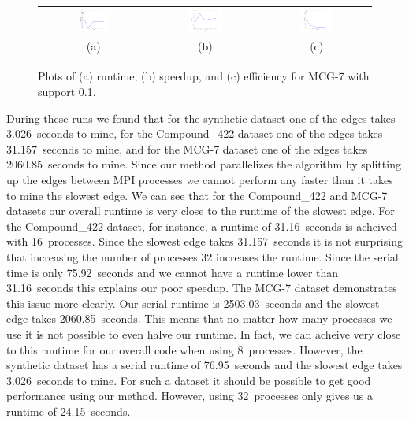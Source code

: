 \begin{figure}
\centering
\begin{tabular}{ccc}
\includegraphics[width=0.3\textwidth]{mcg7_time.png} &
\includegraphics[width=0.3\textwidth]{mcg7_speedup.png} &
\includegraphics[width=0.3\textwidth]{mcg7_efficiency.png} \\
(a) & (b) & (c) \\
\end{tabular}
\caption{Plots of (a) runtime, (b) speedup, and (c) efficiency for
         MCG-7 with support 0.1.}
\label{fig:mcg7}
\end{figure}


During these runs we found that
for the synthetic dataset one of the edges takes 3.026~seconds to mine,
for the Compound\_422 dataset one of the edges takes 31.157~seconds to mine,
and for the MCG-7 dataset one of the edges takes 2060.85~seconds to mine.
Since our method parallelizes the algorithm by splitting up the edges between
MPI processes we cannot perform any faster than it takes to
mine the slowest edge.
We can see that for the Compound\_422 and MCG-7 datasets our overall runtime
is very close to the runtime of the slowest edge. For the Compound\_422
dataset, for instance, a runtime of 31.16~seconds is acheived with
16~processes. Since the slowest edge takes 31.157~seconds it is not surprising
that increasing the number of processes 32 increases the runtime. Since the
serial time is only 75.92~seconds and we cannot have a runtime lower than
31.16~seconds this explains our poor speedup.
The MCG-7 dataset demonstrates this issue more clearly. Our serial runtime
is 2503.03~seconds and the slowest edge takes 2060.85~seconds. This means
that no matter how many processes we use it is not possible to even halve
our runtime. In fact, we can acheive very close to this runtime for our
overall code when using 8~processes.
However, the synthetic dataset has a serial runtime of 76.95~seconds and
the slowest edge takes 3.026~seconds to mine. For such a dataset it should
be possible to get good performance using our method. However, using
32~processes only gives us a runtime of 24.15~seconds.

